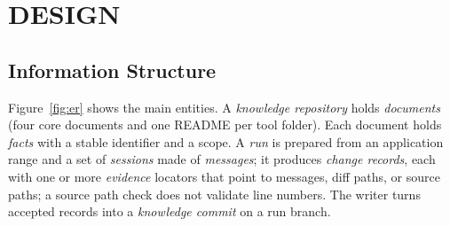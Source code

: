 \chapter{DESIGN}

\section{Information Structure}

Figure~\ref{fig:er} shows the main entities. A \emph{knowledge repository} holds \emph{documents} (four core documents and one README per tool folder). Each document holds \emph{facts} with a stable identifier and a scope. A \emph{run} is prepared from an application range and a set of \emph{sessions} made of \emph{messages}; it produces \emph{change records}, each with one or more \emph{evidence} locators that point to messages, diff paths, or source paths; a source path check does not validate line numbers. The writer turns accepted records into a \emph{knowledge commit} on a run branch.

